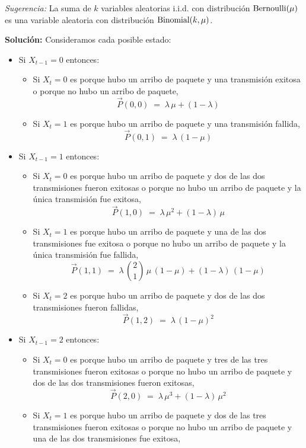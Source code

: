 \documentclass[ a4paper, twoside, 11pt]{article}
\begin{document}
\begin{problem}
\emph{Sugerencia:} La suma de $k$ variables aleatorias i.i.d. con distribuci\'on $\text{Bernoulli}(\mu)$ es una variable aleatoria con distribuci\'on $\text{Binomial}(k,\mu)$. 

\textbf{Soluci\'on:} Consideramos cada posible estado: 
\begin{itemize}
\item Si $X_{t-1} = 0$ entonces: 
\begin{itemize}
\item Si $X_t = 0$ es porque hubo un arribo de paquete y una transmisi\'on exitosa o porque no hubo un arribo de paquete, \iec
\[
\vec{P}(0,0) \; = \; \lambda \, \mu + (1-\lambda)
\]
\item Si $X_t = 1$ es porque hubo un arribo de paquete y una transmisi\'on fallida, \iec
\[
\vec{P}(0,1) \; = \; \lambda \, (1-\mu)
\]
\end{itemize}
\item Si $X_{t-1} = 1$ entonces: 
\begin{itemize}
\item Si $X_t = 0$ es porque hubo un arribo de paquete y dos de las dos transmisiones fueron exitosas o porque no hubo un arribo de paquete y la \'unica transmisi\'on fue exitosa, \iec
\[
\vec{P}(1,0) \; = \; \lambda \, \mu^2 + (1-\lambda) \, \mu
\]
\item Si $X_t = 1$ es porque hubo un arribo de paquete y una de las dos transmisiones fue exitosa o porque no hubo un arribo de paquete y la \'unica transmisi\'on fue fallida, \iec
\[
\vec{P}(1,1) \; = \; \lambda \, { 2 \choose 1 } \, \mu \, (1-\mu) + (1-\lambda) \, (1-\mu)
\]
\item Si $X_t = 2$ es porque hubo un arribo de paquete y dos de las dos transmisiones fueron fallidas, \iec
\[
\vec{P}(1,2) \; = \; \lambda \, (1-\mu)^2
\]
\end{itemize}
\item Si $X_{t-1} = 2$ entonces: 
\begin{itemize}
\item Si $X_t = 0$ es porque hubo un arribo de paquete y tres de las tres transmisiones fueron exitosas o porque no hubo un arribo de paquete y dos de las dos transmisiones fueron exitosas, \iec
\[
\vec{P}(2,0) \; = \; \lambda \, \mu^3 + (1-\lambda) \, \mu^2
\]
\item Si $X_t = 1$ es porque hubo un arribo de paquete y dos de las tres transmisiones fueron exitosas o porque no hubo un arribo de paquete y una de las dos transmisiones fue exitosa, \iec

\end{itemize}
\end{itemize}
\end{problem}
\end{document}
